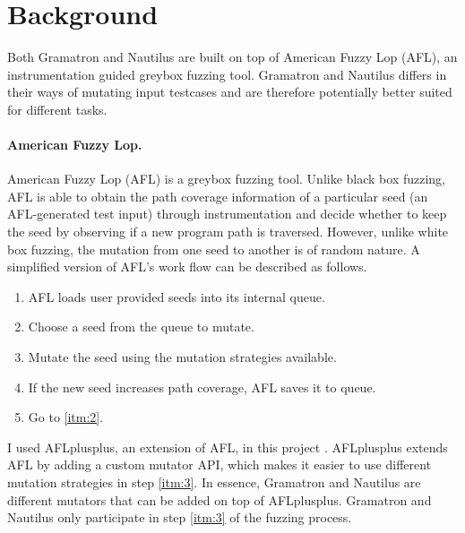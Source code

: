 \section{Background}
\label{sec:relwork}
Both Gramatron and Nautilus are built on top of American Fuzzy Lop (AFL), an instrumentation guided greybox fuzzing tool. Gramatron and Nautilus differs in their ways of mutating input testcases and are therefore potentially better suited for different tasks. 

\paragraph{American Fuzzy Lop.}
American Fuzzy Lop (AFL) is a greybox fuzzing tool. Unlike black box fuzzing, AFL is able to obtain the path coverage information of a particular seed (an AFL-generated test input) through instrumentation and decide whether to keep the seed by observing if a new program path is traversed. However, unlike white box fuzzing, the mutation from one seed to another is of random nature. A simplified version of AFL's work flow can be described as follows.
\begin{enumerate}
    \item AFL loads user provided seeds into its internal queue.
    \item Choose a seed from the queue to mutate. \label{itm:2}
    \item Mutate the seed using the mutation strategies available. \label{itm:3}
    \item If the new seed increases path coverage, AFL saves it to queue.
    \item Go to \ref{itm:2}.
\end{enumerate}

I used AFLplusplus, an extension of AFL, in this project \cite{257204}. AFLplusplus extends AFL by adding a custom mutator API, which makes it easier to use different mutation strategies in step \ref{itm:3}. In essence, Gramatron and Nautilus are different mutators that can be added on top of AFLplusplus. Gramatron and Nautilus only participate in step \ref{itm:3} of the fuzzing process. 

